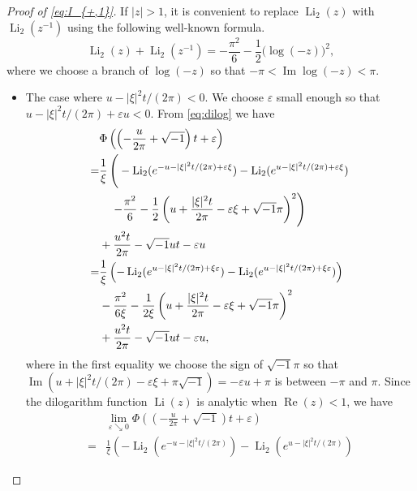 \documentclass[a4paper]{amsart}
\theoremstyle{plain}
\theoremstyle{definition}
\theoremstyle{remark}
\newcommand{\Li}{\operatorname{Li}}
\renewcommand{\Re}{\operatorname{Re}}
\renewcommand{\Im}{\operatorname{Im}}
\numberwithin{equation}{section}
\begin{document}
\begin{proof}[Proof of \eqref{eq:I_{+,1}}]
\par
If $|z|>1$, it is convenient to replace $\Li_2(z)$ with $\Li_2(z^{-1})$ using the following well-known formula.
\begin{equation}\label{eq:dilog}
  \Li_2(z)+\Li_2(z^{-1})
  =
  -\frac{\pi^2}{6}-\frac{1}{2}\bigl(\log(-z)\bigr)^2,
\end{equation}
where we choose a branch of $\log(-z)$ so that $-\pi<\Im\log(-z)<\pi$.
\begin{itemize}
\item The case where $u-|\xi|^2t/(2\pi)<0$.
We choose $\varepsilon$ small enough so that $u-|\xi|^2t/(2\pi)+\varepsilon u<0$.
From \eqref{eq:dilog} we have
\begin{equation*}
\begin{split}
  &\Phi\left(\left(-\frac{u}{2\pi}+\sqrt{-1}\right)t+\varepsilon\right)
  \\
  =&
  \frac{1}{\xi}
  \left(\vphantom{
          \left(u+\frac{|\xi|^2t}{2\pi}-\varepsilon\xi+\sqrt{-1}\pi\right)^2}
    -
    \Li_2(e^{-u-|\xi|^2t/(2\pi)+\varepsilon\xi})
    -
    \Li_2(e^{u-|\xi|^2t/(2\pi)+\varepsilon\xi})
  \right.
  \\
  &
  \left.\quad
    -\frac{\pi^2}{6}
    -\frac{1}{2}
    \left(
      u+\frac{|\xi|^2t}{2\pi}-\varepsilon\xi+\sqrt{-1}\pi
    \right)^2
  \right)
  \\
  &+\frac{u^2t}{2\pi}-\sqrt{-1}ut-\varepsilon u
  \\
  =&
  \frac{1}{\xi}
  \left(
    -
    \Li_2(e^{u-|\xi|^2t/(2\pi)+\xi\varepsilon})
    -
    \Li_2(e^{u-|\xi|^2t/(2\pi)+\xi\varepsilon})
  \right)
  \\
  &-\frac{\pi^2}{6\xi}
  -\frac{1}{2\xi}
  \left(
    u+\frac{|\xi|^2t}{2\pi}-\varepsilon\xi+\sqrt{-1}\pi
  \right)^2
  \\
  &+\frac{u^2t}{2\pi}-\sqrt{-1}ut-\varepsilon u,
\end{split}
\end{equation*}
where in the first equality we choose the sign of $\sqrt{-1}\pi$ so that $\Im(u+|\xi|^2t/(2\pi)-\varepsilon\xi+\pi\sqrt{-1})=-\varepsilon u+\pi$ is between $-\pi$ and $\pi$.
Since the dilogarithm function $\Li(z)$ is analytic when $\Re(z)<1$, we have
\begin{equation*}
\begin{split}
  &\lim_{\varepsilon\searrow0}
  \Phi\left(\left(-\frac{u}{2\pi}+\sqrt{-1}\right)t+\varepsilon\right)
  \\
  =&
  \frac{1}{\xi}
  \left(
    -
    \Li_2(e^{-u-|\xi|^2t/(2\pi)})
    -
    \Li_2(e^{u-|\xi|^2t/(2\pi)})

\end{split}
\end{equation*}
\end{itemize}
\end{proof}
\end{document}
